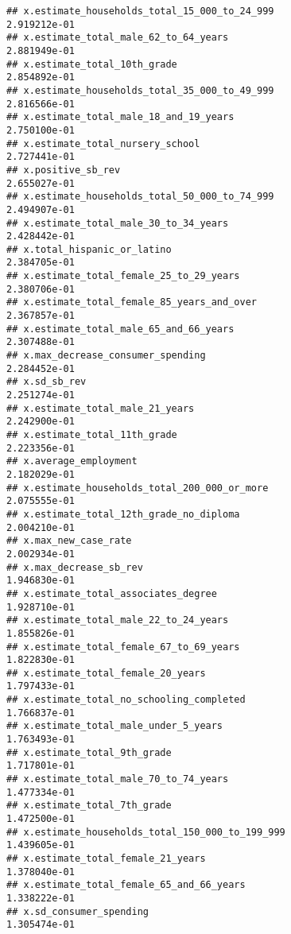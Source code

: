 \documentclass[
]{article}
\begin{document}
\begin{verbatim}
## x.estimate_households_total_15_000_to_24_999                2.919212e-01
## x.estimate_total_male_62_to_64_years                        2.881949e-01
## x.estimate_total_10th_grade                                 2.854892e-01
## x.estimate_households_total_35_000_to_49_999                2.816566e-01
## x.estimate_total_male_18_and_19_years                       2.750100e-01
## x.estimate_total_nursery_school                             2.727441e-01
## x.positive_sb_rev                                           2.655027e-01
## x.estimate_households_total_50_000_to_74_999                2.494907e-01
## x.estimate_total_male_30_to_34_years                        2.428442e-01
## x.total_hispanic_or_latino                                  2.384705e-01
## x.estimate_total_female_25_to_29_years                      2.380706e-01
## x.estimate_total_female_85_years_and_over                   2.367857e-01
## x.estimate_total_male_65_and_66_years                       2.307488e-01
## x.max_decrease_consumer_spending                            2.284452e-01
## x.sd_sb_rev                                                 2.251274e-01
## x.estimate_total_male_21_years                              2.242900e-01
## x.estimate_total_11th_grade                                 2.223356e-01
## x.average_employment                                        2.182029e-01
## x.estimate_households_total_200_000_or_more                 2.075555e-01
## x.estimate_total_12th_grade_no_diploma                      2.004210e-01
## x.max_new_case_rate                                         2.002934e-01
## x.max_decrease_sb_rev                                       1.946830e-01
## x.estimate_total_associates_degree                          1.928710e-01
## x.estimate_total_male_22_to_24_years                        1.855826e-01
## x.estimate_total_female_67_to_69_years                      1.822830e-01
## x.estimate_total_female_20_years                            1.797433e-01
## x.estimate_total_no_schooling_completed                     1.766837e-01
## x.estimate_total_male_under_5_years                         1.763493e-01
## x.estimate_total_9th_grade                                  1.717801e-01
## x.estimate_total_male_70_to_74_years                        1.477334e-01
## x.estimate_total_7th_grade                                  1.472500e-01
## x.estimate_households_total_150_000_to_199_999              1.439605e-01
## x.estimate_total_female_21_years                            1.378040e-01
## x.estimate_total_female_65_and_66_years                     1.338222e-01
## x.sd_consumer_spending                                      1.305474e-01

\end{verbatim}
\end{document}
